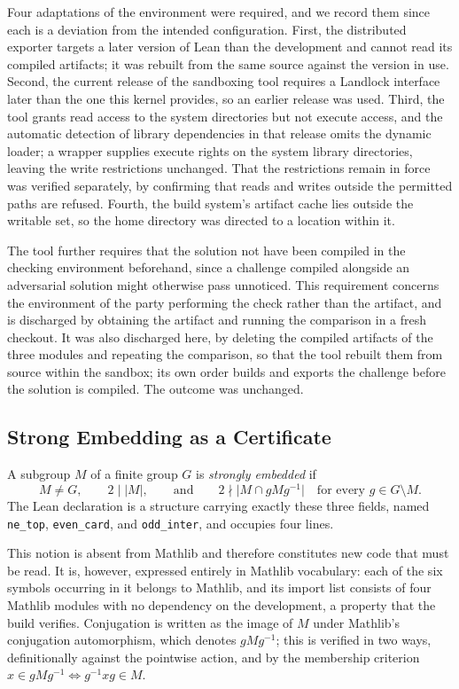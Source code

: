 \documentclass{article}
\begin{document}
Four adaptations of the environment were required, and we record them since each
is a deviation from the intended configuration. First, the distributed exporter
targets a later version of Lean than the development and cannot read its
compiled artifacts; it was rebuilt from the same source against the version in
use. Second, the current release of the sandboxing tool requires a Landlock
interface later than the one this kernel provides, so an earlier release was
used. Third, the tool grants read access to the system directories but not
execute access, and the automatic detection of library dependencies in that
release omits the dynamic loader; a wrapper supplies execute rights on the
system library directories, leaving the write restrictions unchanged. That the
restrictions remain in force was verified separately, by confirming that reads
and writes outside the permitted paths are refused. Fourth, the build system's
artifact cache lies outside the writable set, so the home directory was directed
to a location within it.

The tool further requires that the solution not have been compiled in the
checking environment beforehand, since a challenge compiled alongside an
adversarial solution might otherwise pass unnoticed. This requirement concerns
the environment of the party performing the check rather than the artifact, and
is discharged by obtaining the artifact and running the comparison in a fresh
checkout. It was also discharged here, by deleting the compiled artifacts of the
three modules and repeating the comparison, so that the tool rebuilt them from
source within the sandbox; its own order builds and exports the challenge before
the solution is compiled. The outcome was unchanged.

\subsection{Strong Embedding as a Certificate}
\label{sec:certificate}

A subgroup \(M\) of a finite group \(G\) is \emph{strongly embedded} if
\[
  M\neq G,
  \qquad
  2\mid\lvert M\rvert,
  \qquad\text{and}\qquad
  2\nmid\lvert M\cap gMg^{-1}\rvert
  \quad\text{for every }g\in G\setminus M .
\]
The Lean declaration is a structure carrying exactly these three fields, named
\verb|ne_top|, \verb|even_card|, and \verb|odd_inter|, and occupies four lines.

This notion is absent from Mathlib and therefore constitutes new code that must
be read. It is, however, expressed entirely in Mathlib vocabulary: each of the
six symbols occurring in it belongs to Mathlib, and its import list consists of
four Mathlib modules with no dependency on the development, a property that the
build verifies. Conjugation is written as the image of \(M\) under Mathlib's
conjugation automorphism, which denotes \(gMg^{-1}\); this is verified in two
ways, definitionally against the pointwise action, and by the membership
criterion \(x\in gMg^{-1}\iff g^{-1}xg\in M\).
\end{document}
